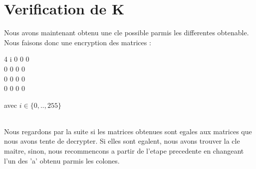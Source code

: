 \documentclass[10pt, a4paper]{report}
\begin{document}
	\section{Verification de K}
	Nous avons maintenant obtenu une cle possible parmis les differentes obtenable. Nous faisons donc une encryption des matrices : \\
	\begin{center}
		\begin{tabular}{4}
			i 0 0 0 \\ 0 0 0 0 \\ 0 0 0 0\\ 0 0 0 0\\
		\end{tabular}
		avec \begin{math}
			i \in \{0,..,255\}
		\end{math} 
	\end{center}\\
	Nous regardons par la suite si les matrices obtenues sont egales aux matrices que nous avons tente de decrypter. Si elles sont egalent, nous avons trouver la cle maitre, sinon, nous recommencons  a partir de l'etape precedente en changeant l'un des 'a' obtenu parmis les colones.
\end{document}
